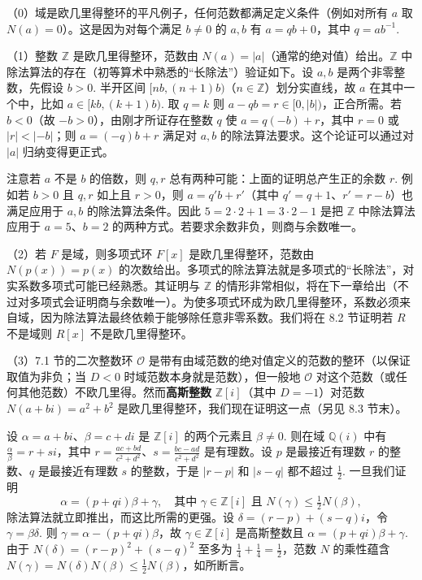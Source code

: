 \begin{example}
（0）域是欧几里得整环的平凡例子，任何范数都满足定义条件（例如对所有 \(a\) 取 \(N(a) = 0\)）。这是因为对每个满足 \(b \neq 0\) 的 \(a, b\) 有 \(a = qb + 0\)，其中 \(q = ab^{-1}\).

（1）整数 \(\mathbb{Z}\) 是欧几里得整环，范数由 \(N(a) = |a|\)（通常的绝对值）给出。\(\mathbb{Z}\) 中除法算法的存在（初等算术中熟悉的“长除法”）验证如下。设 \(a, b\) 是两个非零整数，先假设 \(b > 0\). 半开区间 \([nb, (n+1)b)\)（\(n \in \mathbb{Z}\)）划分实直线，故 \(a\) 在其中一个中，比如 \(a \in [kb, (k+1)b)\). 取 \(q = k\) 则 \(a - qb = r \in [0, |b|)\)，正合所需。若 \(b < 0\)（故 \(-b > 0\)），由刚才所证存在整数 \(q\) 使 \(a = q(-b) + r\)，其中 \(r = 0\) 或 \(|r| < |-b|\)；则 \(a = (-q)b + r\) 满足对 \(a, b\) 的除法算法要求。这个论证可以通过对 \(|a|\) 归纳变得更正式。

注意若 \(a\) 不是 \(b\) 的倍数，则 \(q, r\) 总有两种可能：上面的证明总产生正的余数 \(r\). 例如若 \(b > 0\) 且 \(q, r\) 如上且 \(r > 0\)，则 \(a = q'b + r'\)（其中 \(q' = q+1\)、\(r' = r-b\)）也满足应用于 \(a, b\) 的除法算法条件。因此 \(5 = 2\cdot 2 + 1 = 3\cdot 2 - 1\) 是把 \(\mathbb{Z}\) 中除法算法应用于 \(a = 5\)、\(b = 2\) 的两种方式。若要求余数非负，则商与余数唯一。

（2）若 \(F\) 是域，则多项式环 \(F[x]\) 是欧几里得整环，范数由 \(N(p(x)) = p(x)\) 的次数给出。多项式的除法算法就是多项式的“长除法”，对实系数多项式可能已经熟悉。其证明与 \(\mathbb{Z}\) 的情形非常相似，将在下一章给出（不过对多项式会证明商与余数唯一）。为使多项式环成为欧几里得整环，系数必须来自域，因为除法算法最终依赖于能够除任意非零系数。我们将在 8.2 节证明若 \(R\) 不是域则 \(R[x]\) 不是欧几里得整环。

（3）7.1 节的二次整数环 \(\mathcal{O}\) 是带有由域范数的绝对值定义的范数的整环（以保证取值为非负；当 \(D < 0\) 时域范数本身就是范数），但一般地 \(\mathcal{O}\) 对这个范数（或任何其他范数）不欧几里得。然而\textbf{高斯整数} \(\mathbb{Z}[i]\)（其中 \(D = -1\)）对范数 \(N(a+bi) = a^2+b^2\) 是欧几里得整环，我们现在证明这一点（另见 8.3 节末）。

设 \(\alpha = a+bi\)、\(\beta = c+di\) 是 \(\mathbb{Z}[i]\) 的两个元素且 \(\beta \neq 0\). 则在域 \(\mathbb{Q}(i)\) 中有 \(\frac{\alpha}{\beta} = r + si\)，其中 \(r = \frac{ac+bd}{c^2+d^2}\)、\(s = \frac{bc-ad}{c^2+d^2}\) 是有理数。设 \(p\) 是最接近有理数 \(r\) 的整数、\(q\) 是最接近有理数 \(s\) 的整数，于是 \(|r-p|\) 和 \(|s-q|\) 都不超过 \(\frac{1}{2}\). 一旦我们证明
\[
\alpha = (p+qi)\beta + \gamma, \quad \text{其中 } \gamma \in \mathbb{Z}[i] \text{ 且 } N(\gamma) \leq \tfrac{1}{2}N(\beta),
\]
除法算法就立即推出，而这比所需的更强。设 \(\delta = (r-p) + (s-q)i\)，令 \(\gamma = \beta\delta\). 则 \(\gamma = \alpha - (p+qi)\beta\)，故 \(\gamma \in \mathbb{Z}[i]\) 是高斯整数且 \(\alpha = (p+qi)\beta + \gamma\). 由于 \(N(\delta) = (r-p)^2 + (s-q)^2\) 至多为 \(\frac{1}{4} + \frac{1}{4} = \frac{1}{2}\)，范数 \(N\) 的乘性蕴含 \(N(\gamma) = N(\delta)N(\beta) \leq \frac{1}{2}N(\beta)\)，如所断言。


\end{example}
